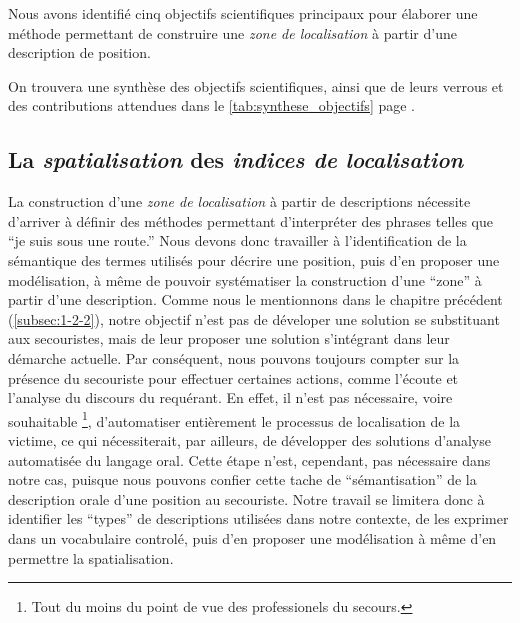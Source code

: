 Nous avons identifié cinq objectifs scientifiques principaux pour
élaborer une méthode permettant de construire une \emph{zone de
  localisation} à partir d'une description de position.

On trouvera une synthèse des objectifs scientifiques, ainsi que de
leurs verrous et des contributions attendues dans le
\autoref{tab:synthese_objectifs} page
\pageref{tab:synthese_objectifs}.

\subsection{La \emph{spatialisation} des \emph{indices de
    localisation}}
\label{subsec:2-1-1}


La construction d'une \emph{zone de localisation} à partir de
descriptions nécessite d'arriver à définir des méthodes permettant
d'interpréter des phrases telles que \enquote{je suis sous une route.}
Nous devons donc travailler à l'identification de la sémantique des
termes utilisés pour décrire une position, puis d'en proposer une
modélisation, à même de pouvoir systématiser la construction d'une
\enquote{zone} à partir d'une description. Comme nous le mentionnons
dans le chapitre précédent (\ref{subsec:1-2-2}), notre objectif n'est
pas de déveloper une solution se substituant aux secouristes, mais de
leur proposer une solution s'intégrant dans leur démarche
actuelle. Par conséquent, nous pouvons toujours compter sur la
présence du secouriste pour effectuer certaines actions, comme
l'écoute et l'analyse du discours du requérant. En effet, il n'est pas
nécessaire, voire souhaitable \footnote{Tout du moins du point de vue
  des professionels du secours.}, d'automatiser entièrement le
processus de localisation de la victime, ce qui nécessiterait, par
ailleurs, de développer des solutions d'analyse automatisée du langage
oral. Cette étape n'est, cependant, pas nécessaire dans notre cas,
puisque nous pouvons confier cette tache de \enquote{sémantisation} de
la description orale d'une position au secouriste. Notre travail se
limitera donc à identifier les \enquote{types} de descriptions
utilisées dans notre contexte, de les exprimer dans un vocabulaire
controlé, puis d'en proposer une modélisation à même d'en permettre la
spatialisation.


